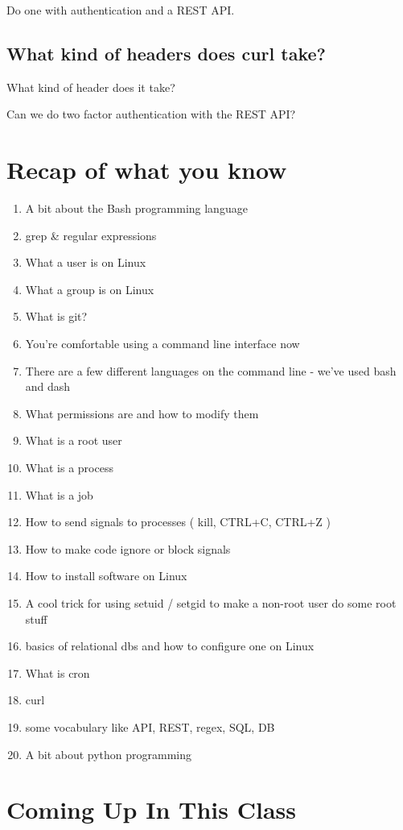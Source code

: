 \documentclass[10pt]{article}
\begin{document}
Do one with authentication and a REST API.

\subsection{What kind of headers does curl take?}
What kind of header does it take?

Can we do two factor authentication with the REST API?


\section{Recap of what you know}
\begin{enumerate}
\item A bit about the Bash programming language
\item grep \& regular expressions
\item What a user is on Linux
\item What a group is on Linux
\item What is git?
\item You're comfortable using a command line interface now
\item There are a few different languages on the command line - we've used bash and dash
\item What permissions are and how to modify them
\item What is a root user
\item What is a process
\item What is a job
\item How to send signals to processes ( kill, CTRL+C, CTRL+Z )
\item How to make code ignore or block signals
\item How to install software on Linux
\item A cool trick for using setuid / setgid to make a non-root user do some root stuff
\item basics of relational dbs and how to configure one on Linux
\item What is cron
\item curl
\item some vocabulary like API, REST, regex, SQL, DB
\item A bit about python programming
\end{enumerate}

\section{Coming Up In This Class}
\end{document}

